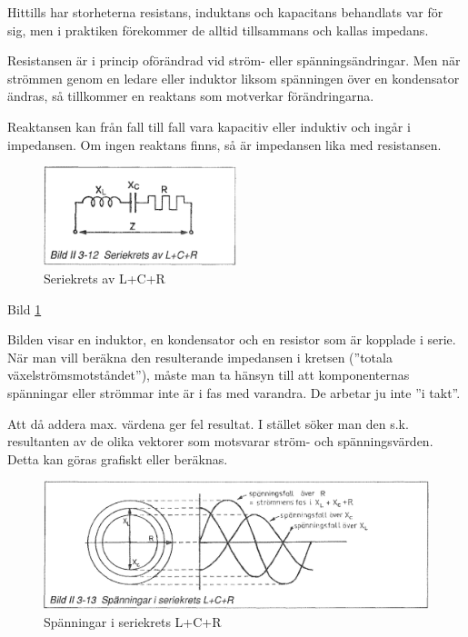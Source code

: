 Hittills har storheterna resistans, induktans och kapacitans behandlats var för
sig, men i praktiken förekommer de alltid tillsammans och kallas impedans.

Resistansen är i princip oförändrad vid ström- eller spänningsändringar. Men när
strömmen genom en ledare eller induktor liksom spänningen över en kondensator
ändras, så tillkommer en reaktans som motverkar förändringarna.

Reaktansen kan från fall till fall vara kapacitiv eller induktiv och ingår i
impedansen. Om ingen reaktans finns, så är impedansen lika med resistansen.

\begin{figure}
\includegraphics[width=0.5\textwidth]{images/bild_2_3-12}
\caption{Seriekrets av L+C+R}
\label{fig:BildII3-12}
\end{figure}

Bild \ref{fig:BildII3-12}

Bilden visar en induktor, en kondensator och en resistor som är kopplade i
serie. När man vill beräkna den resulterande impedansen i kretsen
(''totala växelströmsmotståndet''), måste man ta hänsyn till att komponenternas
spänningar eller strömmar inte är i fas med varandra. De arbetar ju inte
''i takt''.

Att då addera max. värdena ger fel resultat. I stället söker man den s.k.
resultanten av de olika vektorer som motsvarar ström- och spänningsvärden.
Detta kan göras grafiskt eller beräknas.

\begin{figure}
\includegraphics[width=\textwidth]{images/bild_2_3-13}
\caption{Spänningar i seriekrets L+C+R}
\label{fig:BildII3-13}
\end{figure}


